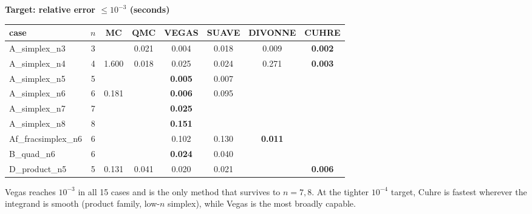 \documentclass[11pt,a4paper]{article}
\newcommand{\best}[1]{\textbf{#1}}
\newcommand{\dd}{\textendash\textendash}
\begin{document}
\begin{center}\scriptsize
\setlength{\tabcolsep}{5pt}
\textbf{Target: relative error $\le 10^{-3}$ (seconds)}\\[2pt]
\begin{tabular}{@{}lccccccc@{}}
\toprule
case & $n$ & MC & QMC & VEGAS & SUAVE & DIVONNE & CUHRE \\
\midrule
A\_simplex\_n3 & 3 & \dd & 0.021 & 0.004 & 0.018 & 0.009 & \best{0.002} \\
A\_simplex\_n4 & 4 & 1.600 & 0.018 & 0.025 & 0.024 & 0.271 & \best{0.003} \\
A\_simplex\_n5 & 5 & \dd & \dd & \best{0.005} & 0.007 & \dd & \dd \\
A\_simplex\_n6 & 6 & 0.181 & \dd & \best{0.006} & 0.095 & \dd & \dd \\
A\_simplex\_n7 & 7 & \dd & \dd & \best{0.025} & \dd & \dd & \dd \\
A\_simplex\_n8 & 8 & \dd & \dd & \best{0.151} & \dd & \dd & \dd \\
Af\_fracsimplex\_n6 & 6 & \dd & \dd & 0.102 & 0.130 & \best{0.011} & \dd \\
B\_quad\_n6 & 6 & \dd & \dd & \best{0.024} & 0.040 & \dd & \dd \\
D\_product\_n5 & 5 & 0.131 & 0.041 & 0.020 & 0.021 & \dd & \best{0.006} \\
\bottomrule
\end{tabular}
\end{center}
Vegas reaches $10^{-3}$ in all 15 cases and is the only method that survives to
$n=7,8$. At the tighter $10^{-4}$ target, Cuhre is fastest wherever the
integrand is smooth (product family, low-$n$ simplex), while Vegas is the most
broadly capable.
\end{document}
